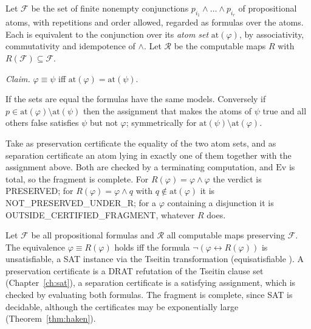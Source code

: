 \begin{example}
\label{ex:conj-fragment}
Let $\mathcal F$ be the set of finite nonempty conjunctions $p_{i_1}\wedge\dots\wedge p_{i_r}$ of propositional atoms, with repetitions and order allowed, regarded as formulas over the atoms. Each is equivalent to the conjunction over its \emph{atom set} $\mathrm{at}(\varphi)$, by associativity, commutativity and idempotence of $\wedge$. Let $\mathcal R$ be the computable maps $R$ with $R(\mathcal F)\subseteq\mathcal F$.

\emph{Claim.} $\varphi\equiv\psi$ iff $\mathrm{at}(\varphi)=\mathrm{at}(\psi)$.

If the sets are equal the formulas have the same models. Conversely if $p\in\mathrm{at}(\varphi)\setminus\mathrm{at}(\psi)$ then the assignment that makes the atoms of $\psi$ true and all others false satisfies $\psi$ but not $\varphi$; symmetrically for $\mathrm{at}(\psi)\setminus\mathrm{at}(\varphi)$.

Take as preservation certificate the equality of the two atom sets, and as separation certificate an atom lying in exactly one of them together with the assignment above. Both are checked by a terminating computation, and $\mathrm{Ev}$ is total, so the fragment is complete. For $R(\varphi)=\varphi\wedge\varphi$ the verdict is \textsf{PRESERVED}; for $R(\varphi)=\varphi\wedge q$ with $q\notin\mathrm{at}(\varphi)$ it is \textsf{NOT\_PRESERVED\_UNDER\_R}; for a $\varphi$ containing a disjunction it is \textsf{OUTSIDE\_CERTIFIED\_FRAGMENT}, whatever $R$ does.
\end{example}

\begin{example}
\label{ex:prop-fragment}
Let $\mathcal F$ be all propositional formulas and $\mathcal R$ all computable maps preserving $\mathcal F$. The equivalence $\varphi\equiv R(\varphi)$ holds iff the formula $\neg(\varphi\leftrightarrow R(\varphi))$ is unsatisfiable, a SAT instance via the Tseitin transformation (equisatisfiable ). A preservation certificate is a DRAT refutation of the Tseitin clause set (Chapter~\ref{ch:sat}), a separation certificate is a satisfying assignment, which is checked by evaluating both formulas. The fragment is complete, since SAT is decidable, although the certificates may be exponentially large (Theorem~\ref{thm:haken}).
\end{example}

